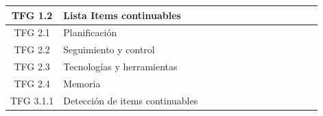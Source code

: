 \begin{table}[h!]
\begin{tabular}{|c|l|c|c|c|c|c|c|c|c|c|c|c|c|}
        \hline
        TFG 1.2                & Lista Items continuables                     &                       & \cellcolor{ganttblue} &                       &                       &                       &                       &                       &                       &                       &                       &                       & \hspace{0pt}          \\
        \hline
        TFG 2.1                & Planificación                                & \cellcolor{ganttblue} & \cellcolor{ganttblue} & \cellcolor{ganttblue} & \cellcolor{ganttblue} & \cellcolor{ganttblue} &                       &                       &                       &                       &                       &                       & \hspace{0pt}          \\
        \hline
        TFG 2.2                & Seguimiento y control                        &                       &                       &                       &                       &                       & \cellcolor{ganttblue} & \cellcolor{ganttblue} & \cellcolor{ganttblue} & \cellcolor{ganttblue} & \cellcolor{ganttblue} & \cellcolor{ganttblue} & \cellcolor{ganttblue} \\
        \hline
        TFG 2.3                & Tecnologías y herramientas                   &                       &                       &                       & \cellcolor{ganttblue} & \cellcolor{ganttblue} &                       &                       &                       &                       &                       &                       & \hspace{0pt}          \\
        \hline
        TFG 2.4                & Memoria                                      &                       &                       &                       & \cellcolor{ganttblue} & \cellcolor{ganttblue} & \cellcolor{ganttblue} & \cellcolor{ganttblue} & \cellcolor{ganttblue} & \cellcolor{ganttblue} & \cellcolor{ganttblue} & \cellcolor{ganttblue} & \cellcolor{ganttblue} \\
        \hline
        TFG 3.1.1              & Detección de items continuables              &                       &                       &                       & \cellcolor{ganttblue} & \cellcolor{ganttblue} &                       &                       &                       &                       &                       &                       & \hspace{0pt}          \\

\end{tabular}
\end{table}
